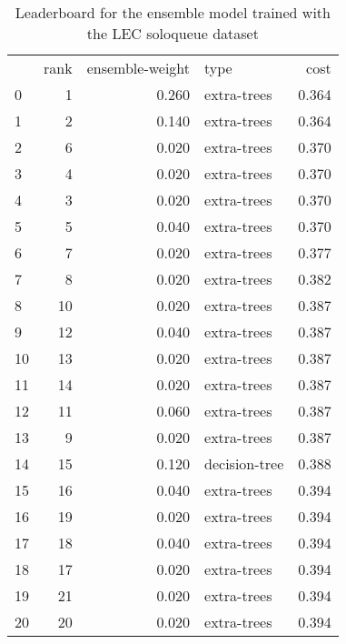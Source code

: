\begin{table}[]
	\centering
	\begin{tabular}{lrrlr}
		   & rank & ensemble-weight & type          & cost  \\
		0  & 1    & 0.260           & extra-trees   & 0.364 \\
		1  & 2    & 0.140           & extra-trees   & 0.364 \\
		2  & 6    & 0.020           & extra-trees   & 0.370 \\
		3  & 4    & 0.020           & extra-trees   & 0.370 \\
		4  & 3    & 0.020           & extra-trees   & 0.370 \\
		5  & 5    & 0.040           & extra-trees   & 0.370 \\
		6  & 7    & 0.020           & extra-trees   & 0.377 \\
		7  & 8    & 0.020           & extra-trees   & 0.382 \\
		8  & 10   & 0.020           & extra-trees   & 0.387 \\
		9  & 12   & 0.040           & extra-trees   & 0.387 \\
		10 & 13   & 0.020           & extra-trees   & 0.387 \\
		11 & 14   & 0.020           & extra-trees   & 0.387 \\
		12 & 11   & 0.060           & extra-trees   & 0.387 \\
		13 & 9    & 0.020           & extra-trees   & 0.387 \\
		14 & 15   & 0.120           & decision-tree & 0.388 \\
		15 & 16   & 0.040           & extra-trees   & 0.394 \\
		16 & 19   & 0.020           & extra-trees   & 0.394 \\
		17 & 18   & 0.040           & extra-trees   & 0.394 \\
		18 & 17   & 0.020           & extra-trees   & 0.394 \\
		19 & 21   & 0.020           & extra-trees   & 0.394 \\
		20 & 20   & 0.020           & extra-trees   & 0.394 \\
	\end{tabular}

	\caption{Leaderboard for the ensemble model trained with the LEC soloqueue dataset}
	\label{tab:lb-lec-games-full}
\end{table}

